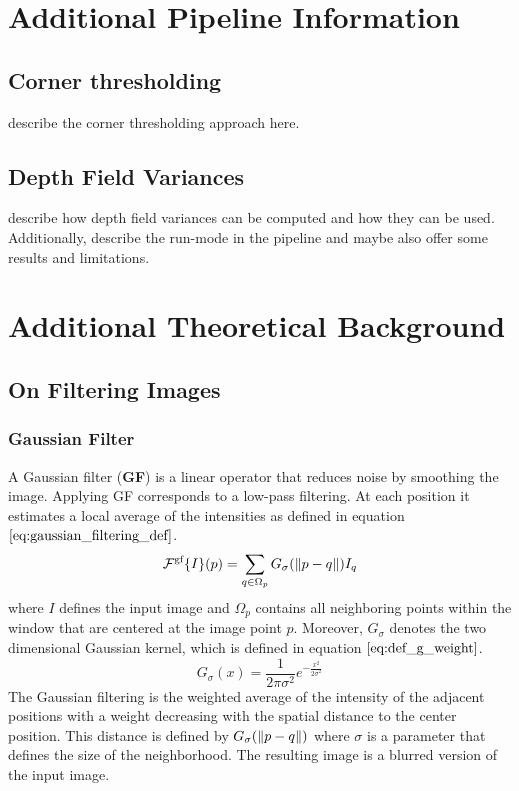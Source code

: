 \chapter{Additional Pipeline Information}
\section{Corner thresholding}
\label{sec:corner_thresholding}
describe the corner thresholding approach here.

\section{Depth Field Variances}
\label{sec:depth_field_variances}
describe how depth field variances can be computed and how they can be used. Additionally, describe the run-mode in the pipeline and maybe also offer some results and limitations.

\chapter{Additional Theoretical Background}
\section{On Filtering Images}
\subsection{Gaussian Filter}
A Gaussian filter (\textbf{GF}) is a linear operator that reduces noise by smoothing the image. Applying GF corresponds to a low-pass filtering.
At each position it estimates a local average of the intensities as defined in equation $\ref{eq:gaussian_filtering_def}$.
\begin{equation}
	\mathcal{F}^{\text{gf}} \{I \} (p) = \sum_{q \in \Omega_p} G_{\sigma} (\left\lVert p - q\right\rVert) I_q
\label{eq:gaussian_filtering_def}
\end{equation}
where $I$ defines the input image and $\Omega_p$ contains all neighboring points within the window that are centered at the image point $p$. Moreover, $G_{\sigma}$ denotes the two dimensional Gaussian kernel, which is defined in equation $\ref{eq:def_g_weight}$.
\begin{equation}
	G_{\sigma} (x) = \frac{1}{2 \pi \sigma^2} e^{-\frac{x^2}{2 \sigma^2}}
\label{eq:def_g_weight}
\end{equation}
The Gaussian filtering is the weighted average of the intensity of the adjacent positions with a weight decreasing with the spatial distance to the center position. This distance is defined by $G_{\sigma} (\left\lVert p - q\right\rVert)$ where $\sigma$ is a parameter that defines the size of the neighborhood. The resulting image is a blurred version of the input image.

